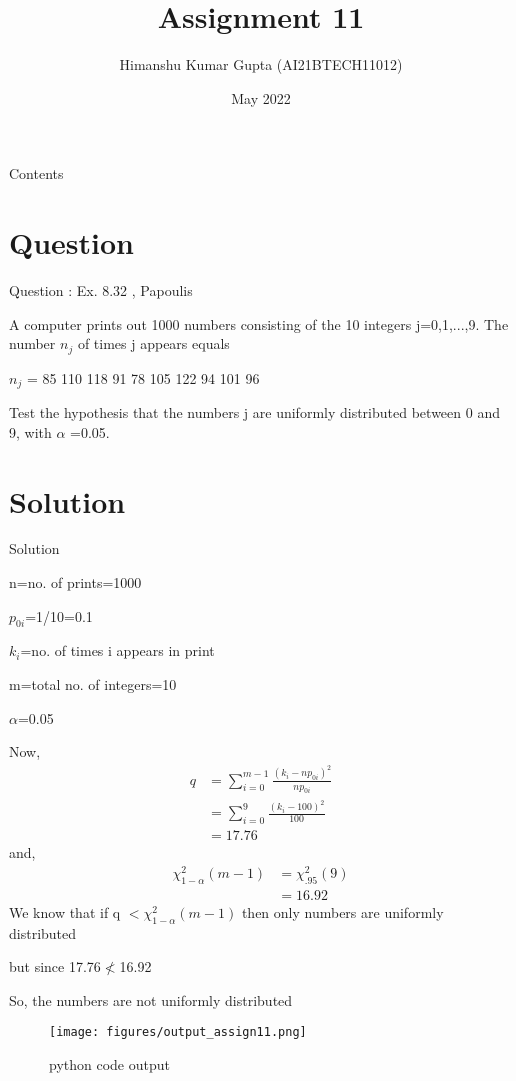 \documentclass[journal,12pt,twocolumn]{beamer}
\title{Assignment 11}
\author{Himanshu Kumar Gupta (AI21BTECH11012)}
\date {May 2022}
\providecommand{\brak}[1]{\ensuremath{\left(#1\right)}}
\begin{document}
\begin{frame}
 \maketitle   
\end{frame}

\begin{frame}{Contents}
    \tableofcontents
\end{frame}

\section{Question}
\begin{frame}{Question : Ex. 8.32 , Papoulis}
\begin{block}

 A computer prints out 1000 numbers consisting of the 10 integers  j=0,1,...,9. The 
number $n_j$ of times j appears equals 

$n_j$ = 85 110 118 91 78 105 122 94 101 96

Test the hypothesis that the numbers j are uniformly distributed between 0 and 9, with 
$\alpha$ =0.05. 
\end{block}
\end{frame}

\section{Solution}
\begin{frame}{Solution}


n=no. of prints=1000

$p_{0i}$=1/10=0.1

$k_i$=no. of times i appears in print

m=total no. of integers=10

$\alpha$=0.05

\end{frame}
\begin{frame}
Now,
\begin{align}
    q&=\sum_{i=0}^{m-1}\frac{\brak{k_i-n p_{0i}}^2}{np_{0i}}    \nonumber\\
    &=\sum_{i=0}^9\frac{\brak{k_i-100}^2}{100} \nonumber\\
    &=17.76
\end{align}
and,
\begin{align}
    \chi^2_{1-\alpha}\brak{m-1}&=\chi^2_{.95}\brak{9 \nonumber}\\
    &=16.92
\end{align}
We know that if q $<\chi^2_{1-\alpha}\brak{m-1}$ then only numbers are uniformly distributed

but since 17.76$\not<$16.92

So, the numbers are not uniformly distributed
\end{frame}
\begin{frame}
   \begin{figure}[htb!]

\texttt{[image: figures/output\_assign11.png]}
\caption{python code output}
\end{figure}
\end{frame}
\end{document}
